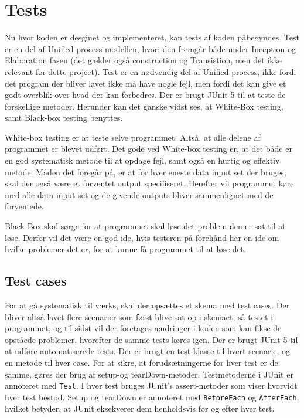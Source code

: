 \chapter{Tests}\label{ch:tests}
Nu hvor koden er desginet og implementeret, kan tests af koden påbegyndes. Test er en del af Unified process modellen, hvori den fremgår både under Inception og Elaboration fasen (det gælder også construction og Transistion, men det ikke relevant for dette project). Test er en nødvendig del af Unified process, ikke fordi det program der bliver lavet ikke må have nogle fejl, men fordi det kan give et godt overblik over hvad der kan forbedres\cite{sestoft2008systematic}. Der er brugt JUnit 5 til at teste de forskellige metoder. Herunder kan det ganske vidst ses, at White-Box testing, samt Black-box testing benyttes. 

White-box testing er at teste selve programmet. Altså, at alle delene af programmet er blevet udført. Det gode ved White-box testing er, at det både er en god systematisk metode til at opdage fejl, samt også en hurtig og effektiv metode. Måden det foregår på, er at for hver eneste data input set der bruges, skal der også være et forventet output specifiseret. Herefter vil programmet køre med alle data input set og de givende outputs bliver sammenlignet med de forventede\cite{sestoft2008systematic}.

Black-Box skal sørge for at programmet skal løse det problem den er sat til at løse. Derfor vil det være en god ide, hvis testeren på forehånd har en ide om hvilke problemer det er, for at kunne få programmet til at løse det\cite{sestoft2008systematic}. 

\section{Test cases}
For at gå systematisk til værks, skal der opsættes et skema med test cases\cite{Heumann}. Der bliver altså lavet flere scenarier som først blive sat op i skemaet, så testet i programmet, og til sidst vil der foretages ændringer i koden som kan fikse de opståede problemer, hvorefter de samme tests køres igen.
Der er brugt JUnit 5 \cite{JUnit} til at udføre automatiserede tests. Der er brugt en test-klasse til hvert scenarie, og en metode til hver case. For at sikre, at forudsætningerne for hver test er de samme, gøres der brug af setup-og tearDown-metoder. Testmetoderne i JUnit er annoteret med \verb|Test|. I hver test bruges JUnit’s assert-metoder som viser hvorvidt hver test bestod. Setup og tearDown er annoteret med \verb|BeforeEach| og \verb|AfterEach|, hvilket betyder, at JUnit eksekverer dem henholdsvis før og efter hver test\cite{MiniprojektTest}.


